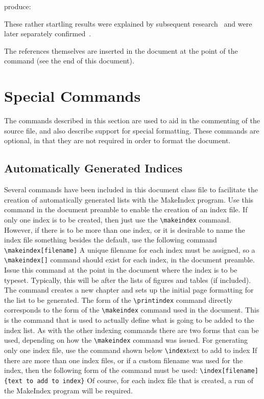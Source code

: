 \documentclass[12pt,Bold,letterpaper,TexShade]{mcgilletdclass}
\begin{document}
produce:

These rather startling results were explained by subsequent 
research~\cite{Ammons:001} and were later separately confirmed~\cite{Fishman:001}.

The references themselves are inserted in the document at
the point of the \verb== command
(see the end of this document).

\chapter{Special Commands}
The commands described in this section are used to aid in the commenting
of the source file, and also describe support for special formatting.
These commands are optional, in that they are not required in order
to format the document.
\section{Automatically Generated Indices}
Several commands have been included in this document class file to facilitate
the creation of automatically generated lists with the MakeIndex
program. 
Use this command in the document preamble to enable the creation of an 
index file. If only one index is to be created, then just use
the
\verb=\makeindex=
command. However, if there is to be more than one index, or it is
desirable to name the index file something besides the default, use
the following command
\verb=\makeindex[filename]=
A unique filename for each index must be assigned, so a \verb=\makeindex[]=
command should exist for each index, in the document preamble.
Issue this command at the point in the document where the index 
is to be typeset. Typically, this will be after the lists of figures and
tables (if included). The command creates a new chapter and sets up
the initial page formatting for the list to be generated. The form of
the \verb=\printindex= command directly corresponds to the form of the
\verb=\makeindex= command used in the document. 
This is the command that is used to actually define what is going to be 
added to the index list. As with the other indexing commands
there are two forms that can be used, depending on how the
\verb=\makeindex= command was issued. For generating only one index file,
use the command shown below
\verb=\index={text to add to index}
If there are more than one index files, or if a custom filename was used
for the index, then the following form of the command must be used:
\verb=\index[filename]{text to add to index}=
Of course, for each index file that is created, a run of the
MakeIndex program will be required. 
\end{document}
